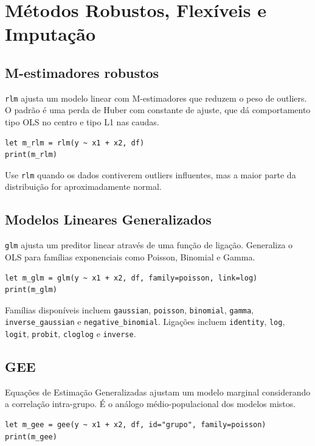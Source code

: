 \chapter{Métodos Robustos, Flexíveis e Imputação}

\section{M-estimadores robustos}

\texttt{rlm} ajusta um modelo linear com M-estimadores que reduzem o peso de
outliers. O padrão é uma perda de Huber com constante de ajuste, que
dá comportamento tipo OLS no centro e tipo L1 nas caudas.

\begin{lstlisting}[caption={Regressão robusta}]
let m_rlm = rlm(y ~ x1 + x2, df)
print(m_rlm)
\end{lstlisting}

Use \texttt{rlm} quando os dados contiverem outliers influentes, mas a maior
parte da distribuição for aproximadamente normal.

\section{Modelos Lineares Generalizados}

\texttt{glm} ajusta um preditor linear através de uma função de ligação.
Generaliza o OLS para famílias exponenciais como Poisson, Binomial e
Gamma.

\begin{lstlisting}[caption={GLM}]
let m_glm = glm(y ~ x1 + x2, df, family=poisson, link=log)
print(m_glm)
\end{lstlisting}

Famílias disponíveis incluem \texttt{gaussian}, \texttt{poisson}, \texttt{binomial}, \texttt{gamma},
\texttt{inverse\_gaussian} e \texttt{negative\_binomial}. Ligações incluem \texttt{identity},
\texttt{log}, \texttt{logit}, \texttt{probit}, \texttt{cloglog} e \texttt{inverse}.

\section{GEE}

Equações de Estimação Generalizadas ajustam um modelo marginal
considerando a correlação intra-grupo. É o análogo médio-populacional
dos modelos mistos.

\begin{lstlisting}[caption={GEE}]
let m_gee = gee(y ~ x1 + x2, df, id="grupo", family=poisson)
print(m_gee)
\end{lstlisting}

